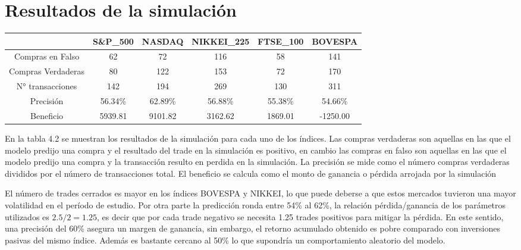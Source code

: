\documentclass[a4paper,12pt]{Latex/Classes/PhDthesisPSnPDF}
\begin{document}
\section{Resultados de la simulación}


\begin{center}
\begin{table}[ht]
\centering
\begin{tabular}{cccccc}
  \hline
 & S\&P\_500 & NASDAQ & NIKKEI\_225 & FTSE\_100 & BOVESPA \\ 
  \hline
Compras en Falso & 62 & 72 & 116 & 58 & 141 \\ 
  Compras Verdaderas & 80 & 122 & 153 & 72 & 170 \\ 
  N° transacciones & 142 & 194 & 269 & 130 & 311 \\ 
  Precisión & 56.34\% & 62.89\% & 56.88\% & 55.38\% & 54.66\% \\ 
  Beneficio & 5939.81 & 9101.82 & 3162.62 & 1869.01 & -1250.00 \\ 
   \hline
\end{tabular}
\end{table}\end{center}

En la tabla 4.2 se muestran los resultados de la simulación para cada uno de los índices. Las compras verdaderas son aquellas en las que el modelo predijo una compra y el resultado del trade en la simulación es positivo, en cambio las compras en falso son aquellas en las que el modelo predijo una compra y la transacción resulto en perdida en la simulación. La precisión se mide como el número compras verdaderas divididos por el número de transacciones total. El beneficio se calcula como el monto de ganancia o pérdida arrojada por la simulación

El número de trades cerrados es mayor en los índices BOVESPA y NIKKEI, lo que puede deberse a que estos mercados tuvieron una mayor volatilidad en el período de estudio. Por otra parte la predicción ronda entre 54\% al 62\%, la relación pérdida/ganancia de los parámetros utilizados es $2.5/2 = 1.25$, es decir que por cada trade negativo se necesita 1.25 trades positivos para mitigar la pérdida. En este sentido, una precisión del 60\% asegura un margen de ganancia, sin embargo, el retorno acumulado obtenido es pobre comparado con inversiones pasivas del mismo índice. Además es bastante cercano al 50\% lo que supondría un comportamiento aleatorio del modelo.
 
\end{document}
